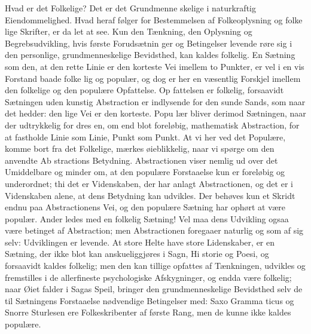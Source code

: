 \documentclass[12pt]{book}
\newcommand{\opage}[1]{\marginnote{\footnotesize\textit{[#1]}}}
\begin{document}
Hvad er det Folkelige? Det er det Grundmenne\-%
skelige i naturkraftig Eiendommelighed. Hvad heraf
følger for Bestemmelsen af Folkeoplysning og folke\-%
lige Skrifter, er da let at see. Kun den Tænkning, den
Oplysning og Begrebsudvikling, hvis første Forudsætnin\-%
ger og Betingelser levende røre sig i den personlige,
grundmenneskelige Bevidsthed, kan kaldes folkelig. En
Sætning som den, at den rette Linie er den korteste Vei
imellem to Punkter, er vel i en vis Forstand baade folke\-%
lig og populær, og dog er her en væsentlig Forskjel
imellem den folkelige og den populære Opfattelse. Op\-%
fattelsen er folkelig, forsaavidt Sætningen uden kunstig
Abstraction er indlysende for den sunde Sands, som
naar det hedder: den lige Vei er den korteste. Popu\-%
lær bliver derimod Sætningen, naar der udtrykkelig for\-%
dres en, om end blot foreløbig, mathematisk Abstraction,
for at fastholde Linie som Linie, Punkt som Punkt. At
vi her ved det Populære, komme bort fra det Folkelige,
mærkes øieblikkelig, naar vi spørge om den anvendte Ab\-%
stractions Betydning. Abstractionen viser nemlig ud over
det Umiddelbare og minder om, at den populære Forstaaelse
kun er foreløbig og underordnet; thi det er Videnskaben,
der har anlagt Abstractionen, og det er i Videnskaben
alene, at dens Betydning kan udvikles. Der behøves
kun et Skridt endnu paa Abstractionens Vei, og den
populære Sætning har ophørt at være populær. Ander\-%
ledes med en folkelig Sætning! Vel maa dens Udvikling
ogsaa være betinget af Abstraction; men Abstractionen
\opage{122}\setcounter{footnote}{0}%
foregaaer naturlig og som af sig selv: Udviklingen er
levende. At store Helte have store Lidenskaber, er en
Sætning, der ikke blot kan anskueliggjøres i Sagn, Hi\-%
storie og Poesi, og forsaavidt kaldes folkelig; men den
kan tillige opfattes af Tænkningen, udvikles og fremstilles
i de allerfineste psychologiske Afskygninger, og endda
være folkelig; naar Øiet falder i Sagas Speil, bringer
den grundmenneskelige Bevidsthed selv de til Sætningens
Forstaaelse nødvendige Betingelser med: Saxo Gramma\-%
ticus og Snorre Sturlesen ere Folkeskribenter af første
Rang, men de kunne ikke kaldes populære.
\end{document}
